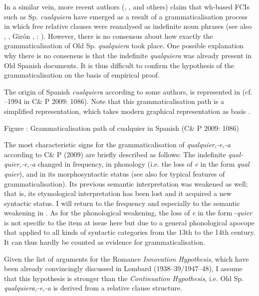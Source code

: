 \documentclass[output=paper]{langscibook}
\begin{document}
In a similar vein, more recent authors (\citealt{Company-CompanyPozas-Loyo2009}, \citealt{Haspelmath1997}, and others) claim that wh-based FCIs such as Sp. \textit{cualquiera} have emerged as a result of a grammaticalisation process in which free relative clauses were reanalysed as indefinite noun phrases (see also \citealt{Palomo1934}, \citealt{Company-CompanyPozas-Loyo2009}, Girón \citealt{Alconchel2012}, \citealt{Brucart1999}: ). However, there is no consensus about how exactly the grammaticalisation of Old Sp. \textit{qualquiera} took place. One possible explanation why there is no consensus is that the indefinite \textit{qualquiera} was already present in Old Spanish documents. It is thus difficult to confirm the hypothesis of the grammaticalisation on the basis of empirical proof. 

  The origin of Spanish \textit{cualquiera} according to some authors, is represented in  (cf. \citealt{Cuervo1886}–1994 in C\& P 2009: 1086). Note that this grammaticalisation path is a simplified representation, which takes modern graphical representation as basis \citep{Elvira2007}. 

\begin{styletablecaption}
Figure : Grammaticalisation path of cualquier in Spanish (C\& P 2009: 1086)
\end{styletablecaption}

The most characteristic signs for the grammaticalisation of \textit{qualquier,-e,-a} according to C\& P (2009) are briefly described as follows: The indefinite \textit{qual-quier,\nobreakdash-e,\nobreakdash-a} changed in frequency, in phonology (i.e. the loss of \textit{e} in the form \textit{qual quier}), and in its morphosyntactic status (see also \citealt{Lehmann1995} for typical features of grammaticalisation). Its previous semantic interpretation was weakened as well; that is, its etymological interpretation has been lost and it acquired a new syntactic status. I will return to the frequency and especially to the semantic weakening in . As for the phonological weakening, the loss of \textit{e} in the form -\textit{quier} is not specific to the item at issue here but due to a general phonological apocope that applied to all kinds of syntactic categories from the 13th to the 14th century. It can thus hardly be counted as evidence for grammaticalisation.

  Given the list of arguments for the Romance \textit{Innovation Hypothesis}, which have been already convincingly discussed in Lombard (1938–39/1947–48), I assume that this hypothesis is stronger than the \textit{Continuation Hypothesis}, i.e. Old Sp.\textbf{ }\textit{qualquiera,-e,-a} is derived from a relative clause structure.
\end{document}
